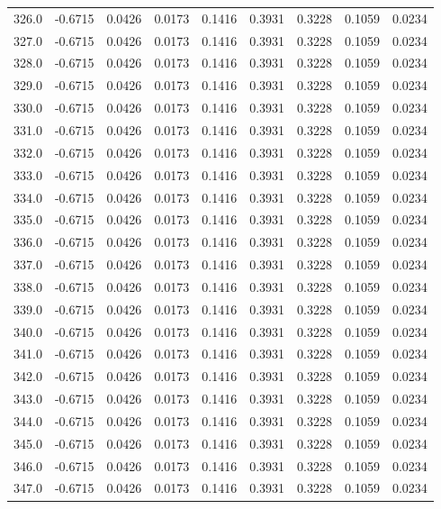 \begin{longtable}{lrrrrrrrr}
326.0 & -0.6715 & 0.0426 & 0.0173 & 0.1416 & 0.3931 & 0.3228 & 0.1059 & 0.0234 \\
327.0 & -0.6715 & 0.0426 & 0.0173 & 0.1416 & 0.3931 & 0.3228 & 0.1059 & 0.0234 \\
328.0 & -0.6715 & 0.0426 & 0.0173 & 0.1416 & 0.3931 & 0.3228 & 0.1059 & 0.0234 \\
329.0 & -0.6715 & 0.0426 & 0.0173 & 0.1416 & 0.3931 & 0.3228 & 0.1059 & 0.0234 \\
330.0 & -0.6715 & 0.0426 & 0.0173 & 0.1416 & 0.3931 & 0.3228 & 0.1059 & 0.0234 \\
331.0 & -0.6715 & 0.0426 & 0.0173 & 0.1416 & 0.3931 & 0.3228 & 0.1059 & 0.0234 \\
332.0 & -0.6715 & 0.0426 & 0.0173 & 0.1416 & 0.3931 & 0.3228 & 0.1059 & 0.0234 \\
333.0 & -0.6715 & 0.0426 & 0.0173 & 0.1416 & 0.3931 & 0.3228 & 0.1059 & 0.0234 \\
334.0 & -0.6715 & 0.0426 & 0.0173 & 0.1416 & 0.3931 & 0.3228 & 0.1059 & 0.0234 \\
335.0 & -0.6715 & 0.0426 & 0.0173 & 0.1416 & 0.3931 & 0.3228 & 0.1059 & 0.0234 \\
336.0 & -0.6715 & 0.0426 & 0.0173 & 0.1416 & 0.3931 & 0.3228 & 0.1059 & 0.0234 \\
337.0 & -0.6715 & 0.0426 & 0.0173 & 0.1416 & 0.3931 & 0.3228 & 0.1059 & 0.0234 \\
338.0 & -0.6715 & 0.0426 & 0.0173 & 0.1416 & 0.3931 & 0.3228 & 0.1059 & 0.0234 \\
339.0 & -0.6715 & 0.0426 & 0.0173 & 0.1416 & 0.3931 & 0.3228 & 0.1059 & 0.0234 \\
340.0 & -0.6715 & 0.0426 & 0.0173 & 0.1416 & 0.3931 & 0.3228 & 0.1059 & 0.0234 \\
341.0 & -0.6715 & 0.0426 & 0.0173 & 0.1416 & 0.3931 & 0.3228 & 0.1059 & 0.0234 \\
342.0 & -0.6715 & 0.0426 & 0.0173 & 0.1416 & 0.3931 & 0.3228 & 0.1059 & 0.0234 \\
343.0 & -0.6715 & 0.0426 & 0.0173 & 0.1416 & 0.3931 & 0.3228 & 0.1059 & 0.0234 \\
344.0 & -0.6715 & 0.0426 & 0.0173 & 0.1416 & 0.3931 & 0.3228 & 0.1059 & 0.0234 \\
345.0 & -0.6715 & 0.0426 & 0.0173 & 0.1416 & 0.3931 & 0.3228 & 0.1059 & 0.0234 \\
346.0 & -0.6715 & 0.0426 & 0.0173 & 0.1416 & 0.3931 & 0.3228 & 0.1059 & 0.0234 \\
347.0 & -0.6715 & 0.0426 & 0.0173 & 0.1416 & 0.3931 & 0.3228 & 0.1059 & 0.0234 \\

\end{longtable}
